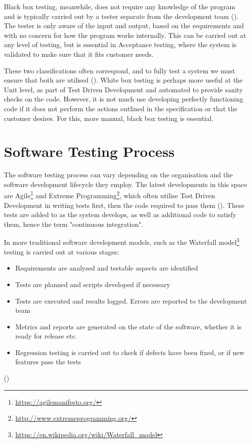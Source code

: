 \documentclass[12pt]{article}
\begin{document}
Black box testing, meanwhile, does not require any knowledge of the program and is typically carried out by a tester separate from the development team (). The tester is only aware of the input and output, based on the requirements and with no concern for how the program works internally. This can be carried out at any level of testing, but is essential in Acceptance testing, where the system is validated to make sure that it fits customer needs. 

These two classifications often correspond, and to fully test a system we must ensure that both are utilised (). White box testing is perhaps more useful at the Unit level, as part of Test Driven Development and automated to provide sanity checks on the code. However, it is not much use developing perfectly functioning code if it does not perform the actions outlined in the specification or that the customer desires. For this, more manual, black box testing is essential.



\section{Software Testing Process}

The software testing process can vary depending on the organisation and the software development lifecycle they employ. The latest developments in this space are Agile\footnote{\url{https://agilemanifesto.org/}} and Extreme Programming\footnote{\url{http://www.extremeprogramming.org/}}, which often utilise Test Driven Development in writing tests first, then the code required to pass them (). These tests are added to as the system develops, as well as additional code to satisfy them, hence the term "continuous integration". 

In more traditional software development models, such as the Waterfall model\footnote{\url{https://en.wikipedia.org/wiki/Waterfall_model}} testing is carried out at various stages:

\begin{itemize}
  \item Requirements are analysed and testable aspects are identified
  \item Tests are planned and scripts developed if necessary
  \item Tests are executed and results logged. Errors are reported to the development team
  \item Metrics and reports are generated on the state of the software, whether it is ready for release etc.
  \item Regression testing is carried out to check if defects have been fixed, or if new features pass the tests
\end{itemize}
()
\end{document}
